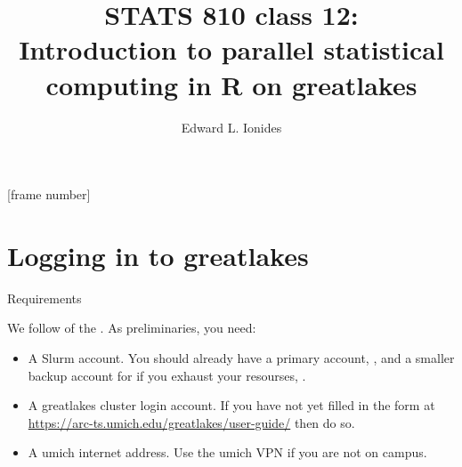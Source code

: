 



\def\CHAPTER{12}
\title{STATS 810 class \CHAPTER:\\Introduction to parallel statistical computing in R on greatlakes}
\author{Edward L. Ionides}

[frame number]






\maketitle



\section{Logging in to greatlakes}

\begin{frame}{Requirements}

We follow  of the . As preliminaries, you need:

\begin{itemize}
  \item A Slurm account. You should already have a primary account, , and a smaller backup account for if you exhaust your resourses, . 
   \item A greatlakes cluster login account. If you have not yet filled in the form at \url{https://arc-ts.umich.edu/greatlakes/user-guide/} then do so.
   \item A umich internet address. Use the umich VPN if you are not on campus.
  \end{itemize}
\end{frame}


